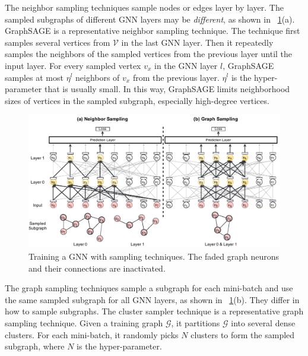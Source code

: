 The neighbor sampling techniques \cite{hamilton2017_graphsage, ying2018_pinsage, chen2018_fastgcn, chen2018_sgcn, huang2018_adap} sample nodes or edges layer by layer.
%
The sampled subgraphs of different GNN layers may be \emph{different}, as shown in \figurename~\ref{fig:gnn_sampling}(a).
%
GraphSAGE \cite{hamilton2017_graphsage} is a representative neighbor sampling technique.
%
The technique first samples several vertices from $\mathcal{V}$ in the last GNN layer.
%
Then it repeatedly samples the neighbors of the sampled vertices from the previous layer until the input layer.
%
For every sampled vertex $v_x$ in the GNN layer $l$, GraphSAGE samples at most $\eta^l$ neighbors of $v_x$ from the previous layer.
%
$\eta^l$ is the hyper-parameter that is usually small.
%
In this way, GraphSAGE limits neighborhood sizes of vertices in the sampled subgraph, especially high-degree vertices.

\begin{figure}[H]
    \centering
    \includegraphics[width=0.9\columnwidth]{figs/illustration/sampling_techniques.pdf}
    \caption{Training a GNN with sampling techniques. The faded graph neurons and their connections are inactivated.}
    \label{fig:gnn_sampling}
\end{figure}

The graph sampling techniques \cite{zeng2018_aesg, chiang2019_cluster_gcn, zeng2020_graphsaint} sample a subgraph for each mini-batch and use the same sampled subgraph for all GNN layers, as shown in \figurename~\ref{fig:gnn_sampling}(b).
%
They differ in how to sample subgraphs.
%
The cluster sampler technique \cite{chiang2019_cluster_gcn} is a representative graph sampling technique.
%
Given a training graph $\mathcal{G}$, it partitions $\mathcal{G}$ into several dense clusters.
%
For each mini-batch, it randomly picks $N$ clusters to form the sampled subgraph, where $N$ is the hyper-parameter.

